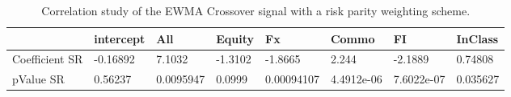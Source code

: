 \begin{table}[H]
\centering
\begin{tabular}{llllllll}
& intercept & All & Equity & Fx & Commo & FI & InClass \\ 
\hline 
Coefficient SR & -0.16892 & 7.1032 & -1.3102 & -1.8665 & 2.244 & -2.1889 & 0.74808 \\ 
pValue SR & 0.56237 & 0.0095947 & 0.0999 & 0.00094107 & 4.4912e-06 & 7.6022e-07 & 0.035627 \\ 
\hline
\end{tabular}
\caption{Correlation study of the EWMA Crossover signal with a risk parity weighting scheme.}
\label{MBBSRPOQ_CORR}
\end{table}